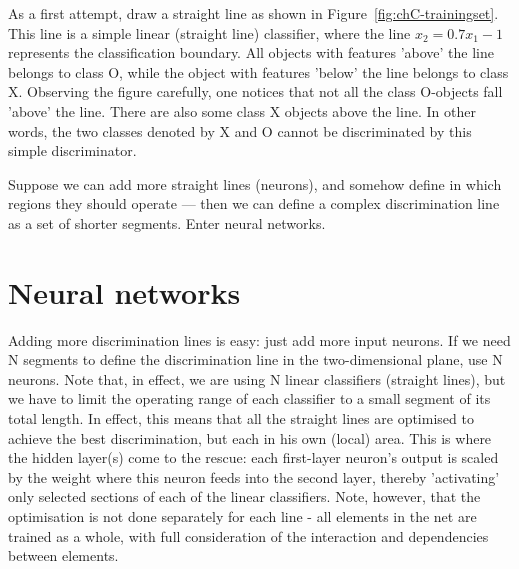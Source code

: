 As a first attempt, draw a straight line as shown in Figure~\ref{fig:chC-trainingset}.  This line is a simple linear (straight line) classifier, where the line $x_2=0.7x_1-1$  represents the classification boundary.  All objects with features 'above' the line belongs to class O, while the object with features 'below' the line belongs to class X.  Observing the figure carefully, one notices that not all the class O-objects fall 'above' the line.  There are also some class X objects above the line.   In other words, the two classes denoted by X and O cannot be discriminated by this simple discriminator.  


Suppose we can add more straight lines (neurons), and somehow define in which regions they should operate --- then we can define a complex discrimination line as a set of shorter segments.  Enter neural networks.

\section{Neural networks}

Adding more discrimination lines is easy: just add more input neurons.  If we need N segments to define the discrimination line in the two-dimensional plane, use N neurons.   Note that, in effect, we are using N linear classifiers (straight lines), but we have to limit the operating range of each classifier to a small segment of its total length.    In effect, this means that all the straight lines are optimised to achieve the best discrimination, but each in his own (local) area.  This is where the hidden layer(s) come to the rescue:  each first-layer neuron's output is scaled by the weight where this neuron feeds into the second layer, thereby 'activating' only selected sections of each of the linear classifiers.  Note, however, that the optimisation is not done separately for each line - all elements in the net are trained as a whole, with full consideration of the interaction and dependencies between elements.  


